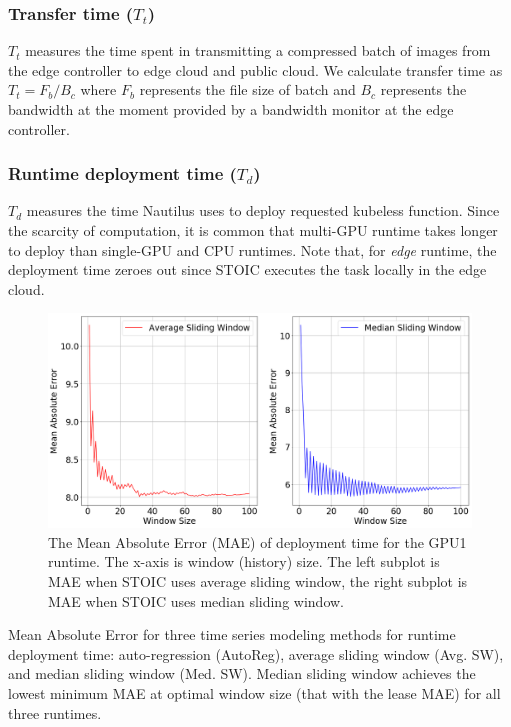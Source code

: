 \subsubsection{Transfer time ($T_t$)} 

$T_t$ measures the time spent in transmitting a compressed batch of images
from the edge controller to edge cloud and public cloud.  We calculate
transfer time as ${T_t = F_b / B_c}$ where $F_b$ represents the file size of
batch and $B_c$ represents the bandwidth at the moment provided by a bandwidth
monitor at the edge controller. 
 
\subsubsection{Runtime deployment time ($T_d$)} 

$T_d$ measures the time
Nautilus uses to deploy requested kubeless function. Since the scarcity of
computation, it is common that multi-GPU runtime takes longer to deploy than
single-GPU and CPU runtimes. Note that, for \textit{edge} runtime, the
deployment time zeroes out since STOIC executes the task locally in the edge
cloud.
 
\begin{figure}
    \centering
    \includegraphics[scale=0.28]{figures/deployment}
    \caption{The Mean Absolute Error (MAE) of deployment time for the GPU1 runtime. The x-axis is window (history) size. The left subplot is MAE when STOIC uses average sliding window, the right subplot is MAE when STOIC uses median sliding window.
\label{fig:deployment}}
\end{figure}

 
\begin{table}
\centering

\caption{Mean Absolute Error for three time series modeling methods for runtime deployment time: auto-regression (AutoReg), average sliding window (Avg. SW), and median sliding window (Med. SW). Median sliding window achieves the lowest minimum MAE at optimal window size (that with the lease MAE) for all three runtimes. \label{tab:deployment}}
\end{table}
 

